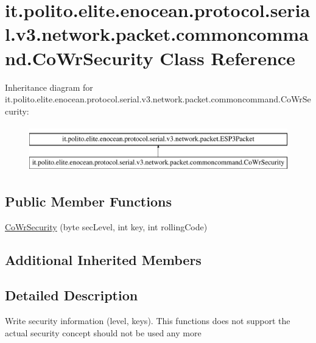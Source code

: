 \hypertarget{classit_1_1polito_1_1elite_1_1enocean_1_1protocol_1_1serial_1_1v3_1_1network_1_1packet_1_1commoncommand_1_1_co_wr_security}{}\section{it.\+polito.\+elite.\+enocean.\+protocol.\+serial.\+v3.\+network.\+packet.\+commoncommand.\+Co\+Wr\+Security Class Reference}
\label{classit_1_1polito_1_1elite_1_1enocean_1_1protocol_1_1serial_1_1v3_1_1network_1_1packet_1_1commoncommand_1_1_co_wr_security}
Inheritance diagram for it.\+polito.\+elite.\+enocean.\+protocol.\+serial.\+v3.\+network.\+packet.\+commoncommand.\+Co\+Wr\+Security\+:\begin{figure}[H]
\begin{center}
\leavevmode
\includegraphics[height=2.000000cm]{classit_1_1polito_1_1elite_1_1enocean_1_1protocol_1_1serial_1_1v3_1_1network_1_1packet_1_1commoncommand_1_1_co_wr_security}
\end{center}
\end{figure}
\subsection*{Public Member Functions}
\begin{DoxyCompactItemize}
\item 
\hyperlink{classit_1_1polito_1_1elite_1_1enocean_1_1protocol_1_1serial_1_1v3_1_1network_1_1packet_1_1commoncommand_1_1_co_wr_security_a2b8cafd9f11b9ee828738c49abf893a5}{Co\+Wr\+Security} (byte sec\+Level, int key, int rolling\+Code)
\end{DoxyCompactItemize}
\subsection*{Additional Inherited Members}


\subsection{Detailed Description}
Write security information (level, keys). This functions does not support the actual security concept should not be used any more

